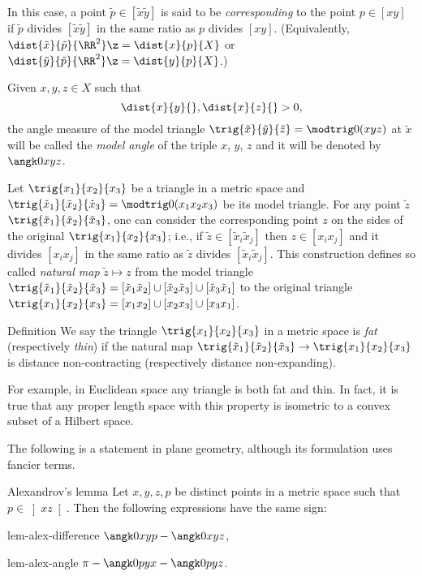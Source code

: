 In this case, a point $\tilde p\in [{\tilde x}{\tilde y}]$ is said to be \emph{corresponding} to the point $p\in [xy]$
if $\tilde p$ divides $[\tilde x\tilde y]$ in the same ratio as $p$ divides $[xy]$.
(Equivalently, $\dist{\tilde x}{\tilde p}{\RR^2}\z=\dist{x}{p}{X}$ or 
 $\dist{\tilde y}{\tilde p}{\RR^2}\z=\dist{y}{p}{X}$.)



Given $x,y,z \in X$ such that
$$\dist{x}{y}{},\dist{x}{z}{}>0,$$ the angle measure of the model triangle
$\trig{\tilde x}{\tilde y}{\tilde z}=\modtrig0(x y z)$ at $\tilde  x$ will be called the \emph{model angle} of the triple $x$, $y$, $z$ and it will be denoted by
$\angk0 x y z$.

Let $\trig{x_1}{x_2}{x_3}$ be a triangle in a metric space
and 
$\trig{\tilde x_1}{\tilde x_2}{\tilde x_3}=\modtrig0({x_1}{x_2}{x_3})$ be its model triangle.
For any point $\tilde z$ $\trig{\tilde x_1}{\tilde x_2}{\tilde x_3}$,
one can consider the corresponding point $z$ on the sides of the original $\trig{x_1}{x_2}{x_3}$;
i.e., if $\tilde z\in [\tilde x_i\tilde x_j]$ then $z\in[x_ix_j]$ and it divides $[x_ix_j]$ in the same ratio as $\tilde z$ divides $[\tilde x_i\tilde x_j]$.
This construction defines so called \emph{natural map} $\tilde z\mapsto z$ from the model triangle
$\trig{\tilde x_1}{\tilde x_2}{\tilde x_3}=[{\tilde x_1}{\tilde x_2}]\cup[{\tilde x_2}{\tilde x_3}]\cup[{\tilde x_3}{\tilde x_1}]$ 
to the original triangle $\trig{x_1}{x_2}{x_3}= [{x_1}{x_2}]\cup[{x_2}{x_3}]\cup[{x_3}{x_1}]$.

\begin{thm}{Definition}\label{def:fat-thin}
We say the triangle $\trig{x_1}{x_2}{x_3}$ in a metric space is 
\emph{fat} (respectively \emph{thin}) 
if the natural map $\trig{\tilde x_1}{\tilde x_2}{\tilde x_3}\to \trig{x_1}{x_2}{x_3}$ is distance non-contracting (respectively distance non-expanding).
\end{thm}
For example, in Euclidean space any triangle is both fat and thin.
In fact, it is true that any proper length space with this property is isometric to a convex subset of a Hilbert space.

The following is a statement in plane geometry,
although its formulation uses fancier terms.


\begin{thm}{Alexandrov's lemma}
\label{lem:alex}  
Let $x,y,z,p$ be distinct points in a metric space such that $p\in \left]x z\right[$.
Then the following expressions have the same sign:
\begin{subthm}{lem-alex-difference}
$\angk0 x y p
-\angk0 x y z$,
\end{subthm} 

\begin{subthm}{lem-alex-angle}
$\pi - \angk0 p y x
-\angk0 p y z$.
\end{subthm}

\end{thm}


